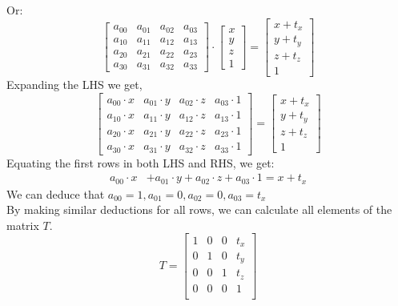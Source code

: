 Or:
\[
\begin{bmatrix}
a_{00} & a_{01} & a_{02} & a_{03} \\
a_{10} & a_{11} & a_{12} & a_{13} \\
a_{20} & a_{21} & a_{22} & a_{23} \\
a_{30} & a_{31} & a_{32} & a_{33}
\end{bmatrix}
\cdot
\begin{bmatrix}
x \\
y \\
z \\
1
\end{bmatrix}
=
\begin{bmatrix}
x + t_x \\
y + t_y \\
z + t_z \\
1
\end{bmatrix}
\]
Expanding the LHS we get,
\[
\begin{bmatrix}
a_{00} \cdot x & a_{01} \cdot y  & a_{02} \cdot z  & a_{03} \cdot 1 \\
a_{10} \cdot x  & a_{11} \cdot y  & a_{12} \cdot z  & a_{13} \cdot 1 \\
a_{20} \cdot x  & a_{21} \cdot y  & a_{22} \cdot z  & a_{23} \cdot 1 \\
a_{30} \cdot x  & a_{31} \cdot y  & a_{32} \cdot z  & a_{33} \cdot 1  
\end{bmatrix}
=
\begin{bmatrix}
x + t_x \\
y + t_y \\
z + t_z \\
1
\end{bmatrix}
\]
Equating the  first rows in both LHS and RHS, we get:
\begin{align*}
a_{00} \cdot x &+ a_{01} \cdot y + a_{02} \cdot z + a_{03} \cdot 1 = x + t_x
\end{align*}
We can deduce that $a_{00} = 1, a_{01} = 0,a_{02} = 0,a_{03} = t_x$\\
By making similar deductions for all rows, we can calculate all elements of the matrix \(T\).
\begin{equation}
T =
\begin{bmatrix}
1 & 0  & 0  & t_x \\
0 & 1  & 0  & t_y \\
0 & 0  & 1  & t_z \\
0 & 0  & 0  & 1 \\
\end{bmatrix}
\end{equation}
